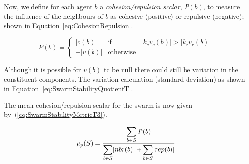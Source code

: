 \documentclass{ieeeaccess}
\begin{document}
Now, we define for each agent $b$ a \textit{cohesion/repulsion scalar}, $P(b)$, to measure the influence of the neighbours of $b$ as cohesive (positive) or repulsive (negative); shown in Equation~\ref{eq:CohesionRepulsion}.

\begin{equation}
\label{eq:CohesionRepulsion}
P(b) = \left\{\begin{array}{lll}
               |v(b)|& \mathrm{if} & |k_cv_c(b)| > |k_r v_r(b)|\\
              -|v(b)|& \mathrm{otherwise}
              \end{array}\right.
\end{equation}

Although it is possible for $v(b)$ to be null there could still be variation in the constituent components. The variation calculation (standard deviation) as shown in Equation~\ref{eq:SwarmStabilityQuotientT}. 



The mean cohesion/repulsion scalar for the swarm is now given by~(\ref{eq:SwarmStabilityMetricT3}).  

\begin{equation}
\label{eq:SwarmStabilityMetricT3}
\mu_p(S) = \frac{\mathlarger{\sum_{b \in S} P(b)}}{\mathlarger{\sum_{b \in S}}|nbr(b)| + \mathlarger{\sum_{b \in S}}|rep(b)|}
\end{equation}

\end{document}
